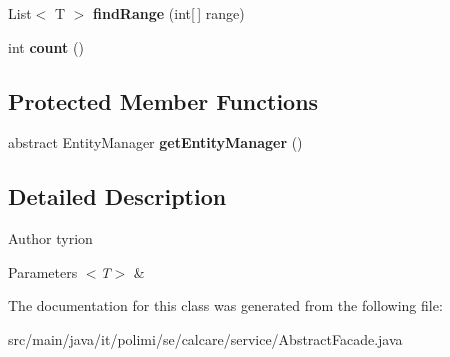\begin{DoxyCompactItemize}
\item 
\hypertarget{classit_1_1polimi_1_1se_1_1calcare_1_1service_1_1AbstractFacade_aed69356aea8afd5a4cff33126fe2677b}{}List$<$ T $>$ {\bfseries find\+Range} (int\mbox{[}$\,$\mbox{]} range)\label{classit_1_1polimi_1_1se_1_1calcare_1_1service_1_1AbstractFacade_aed69356aea8afd5a4cff33126fe2677b}

\item 
\hypertarget{classit_1_1polimi_1_1se_1_1calcare_1_1service_1_1AbstractFacade_af8a8672a6f630f67f23a3a4d84c3eee6}{}int {\bfseries count} ()\label{classit_1_1polimi_1_1se_1_1calcare_1_1service_1_1AbstractFacade_af8a8672a6f630f67f23a3a4d84c3eee6}

\end{DoxyCompactItemize}
\subsection*{Protected Member Functions}
\begin{DoxyCompactItemize}
\item 
\hypertarget{classit_1_1polimi_1_1se_1_1calcare_1_1service_1_1AbstractFacade_af384d2c91ce1c00ebf0da183ddd090f1}{}abstract Entity\+Manager {\bfseries get\+Entity\+Manager} ()\label{classit_1_1polimi_1_1se_1_1calcare_1_1service_1_1AbstractFacade_af384d2c91ce1c00ebf0da183ddd090f1}

\end{DoxyCompactItemize}


\subsection{Detailed Description}
\begin{DoxyAuthor}{Author}
tyrion 
\end{DoxyAuthor}

\begin{DoxyParams}{Parameters}
{\em $<$\+T$>$} & \\
\hline
\end{DoxyParams}


The documentation for this class was generated from the following file\+:\begin{DoxyCompactItemize}
\item 
src/main/java/it/polimi/se/calcare/service/Abstract\+Facade.\+java\end{DoxyCompactItemize}
